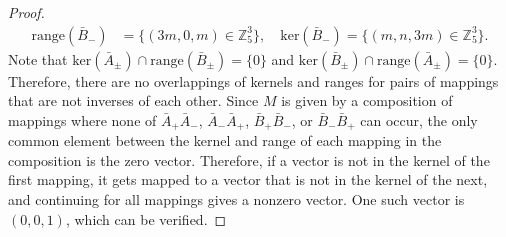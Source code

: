 \begin{proof}
\begin{align}
      \mathrm{range}(\bar{B}_{-}) &= \{ (3m, 0, m) \in \mathbb{Z}_5^3 \}, \quad \mathrm{ker}(\bar{B}_{-}) = \{ (m, n, 3m) \in \mathbb{Z}_5^3 \}.
    \end{align}
    Note that $\mathrm{ker}(\bar{A}_{\pm}) \cap \mathrm{range}(\bar{B}_{\pm}) = \{0\}$ and $\mathrm{ker}(\bar{B}_{\pm}) \cap \mathrm{range}(\bar{A}_{\pm}) = \{0\}$. Therefore, there are no overlappings of kernels and ranges for pairs of mappings that are not inverses of each other. Since $M$ is given by a composition of mappings where none of $\bar{A}_{+} \bar{A}_{-}$, $\bar{A}_{-} \bar{A}_{+}$, $\bar{B}_{+} \bar{B}_{-}$, or $\bar{B}_{-} \bar{B}_{+}$ can occur, the only common element between the kernel and range of each mapping in the composition is the zero vector. Therefore, if a vector is not in the kernel of the first mapping, it gets mapped to a vector that is not in the kernel of the next, and continuing for all mappings gives a nonzero vector. One such vector is $(0, 0, 1)$, which can be verified. 
  \end{proof}

